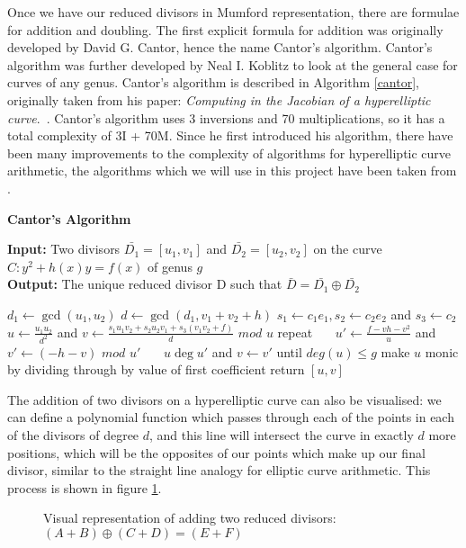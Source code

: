 Once we have our reduced divisors in Mumford representation, there are formulae for addition and doubling. The first explicit formula for addition was originally developed by David G. Cantor, hence the name Cantor's algorithm. Cantor's algorithm was further developed by Neal I. Koblitz to look at the general case for curves of any genus. Cantor's algorithm is described in Algorithm \ref{cantor}, originally taken from his paper: \emph{Computing in the Jacobian of a hyperelliptic curve}.~\cite{cantor1987computing}. Cantor's algorithm uses 3 inversions and 70 multiplications, so it has a total complexity of 3I + 70M. Since he first introduced his algorithm, there have been many improvements to the complexity of algorithms for hyperelliptic curve arithmetic, the algorithms which we will use in this project have been taken from \cite{cohen2005handbook}.
\begin{algorithm}[!htb]
\caption{\bf Cantor's Algorithm}
\label{cantor}
\textbf{Input:} Two divisors $\bar{D_1} = [u_1, v_1]$ and $\bar{D_2} = [u_2, v_2]$ on the curve $C : y^2+h(x)y=f(x)$ of genus $g$ \\
\textbf{Output:} The unique reduced divisor D such that $\bar{D} = \bar{D_1}\oplus\bar{D_2}$ 
\algrule
\begin{algorithmic}[1]
\State $d_1 \longleftarrow \gcd(u_1,u_2)$\;
\State $d \longleftarrow \gcd(d_1,v_1 + v_2 + h)$\;
\State $s_1 \longleftarrow c_1e_1, s_2 \longleftarrow c_2e_2$ and $s_3 \longleftarrow c_2$\;
\State$u \longleftarrow \frac{u_1u_2}{d^2}$ and $v \longleftarrow \frac{s_1u_1v_2 + s_2u_2v_1 + s_3(v_1v_2 + f)}{d}$ $mod$ $u$\;
\State repeat\;
\State \ \ \ $u' \longleftarrow \frac{f-vh-v^2}{u}$ and $v' \longleftarrow (-h-v)$ $mod$ $u'$ \;
\State \ \ \ $u \deg u'$ and $v \longleftarrow v'$\;
\State until $deg(u) \leq g$\;
\State make $u$ monic by dividing through by value of first coefficient\;
\State return $[u,v]$\;
\end{algorithmic}
\end{algorithm}
The addition of two divisors on a hyperelliptic curve can also be visualised: we can define a polynomial function which passes through each of the points in each of the divisors of degree $d$, and this line will intersect the curve in exactly $d$ more positions, which will be the opposites of our points which make up our final divisor, similar to the straight line analogy for elliptic curve arithmetic. This process is shown in figure \ref{fig:HECCdot}.
\begin{figure}[!htb]
\centering
\resizebox{5cm}{!}{}
\caption{Visual representation of adding two reduced divisors: $(A+B) \oplus (C+D) = (E+F)$}
\label{fig:HECCdot}
\end{figure}
